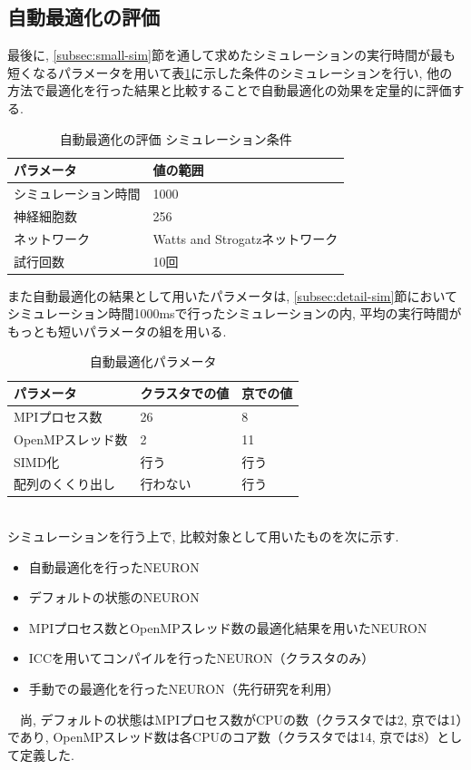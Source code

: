 \subsection{自動最適化の評価}
\label{subsec:compare}
最後に, \ref{subsec:small-sim}節を通して求めたシミュレーションの実行時間が最も短くなるパラメータを用いて表\ref{table:sim-cond}に示した条件のシミュレーションを行い,
他の方法で最適化を行った結果と比較することで自動最適化の効果を定量的に評価する.\\
\begin{table}[htb]
\caption {自動最適化の評価 シミュレーション条件}
\begin{center}
  \begin{tabular}{|p{6cm}|p{8cm}|}
    \hline
    パラメータ & 値の範囲\\ \hline
    シミュレーション時間 & 1000\\ \hline
    神経細胞数 & 256\\ \hline
    ネットワーク & Watts and Strogatzネットワーク\\ \hline
    試行回数 & 10回 \\ \hline
  \end{tabular}
  \label{table:sim-cond}
\end{center}
\end{table}

また自動最適化の結果として用いたパラメータは,
\ref{subsec:detail-sim}節においてシミュレーション時間1000msで行ったシミュレーションの内,
平均の実行時間がもっとも短いパラメータの組を用いる.\\
\begin{table}[htb]
  \caption {自動最適化パラメータ}
  \begin{center}
    \begin{tabular}{|p{4cm}|p{5cm}|p{5cm}|}
      \hline
      パラメータ & クラスタでの値 & 京での値\\ \hline
      MPIプロセス数 & 26 & 8\\ \hline
      OpenMPスレッド数 & 2 & 11\\ \hline
      SIMD化 & 行う & 行う\\ \hline
      配列のくくり出し & 行わない & 行う \\ \hline
    \end{tabular}
    \label{table:auto-tuned-param}
  \end{center}
\end{table}\\

シミュレーションを行う上で, 比較対象として用いたものを次に示す.
\begin{itemize}
\item 自動最適化を行ったNEURON
\item デフォルトの状態のNEURON
\item MPIプロセス数とOpenMPスレッド数の最適化結果を用いたNEURON
\item ICCを用いてコンパイルを行ったNEURON（クラスタのみ）
\item 手動での最適化を行ったNEURON（先行研究\cite{miyamoto-master}を利用）
\end{itemize}
　尚, デフォルトの状態はMPIプロセス数がCPUの数（クラスタでは2, 京では1）であり,
OpenMPスレッド数は各CPUのコア数（クラスタでは14, 京では8）として定義した.
